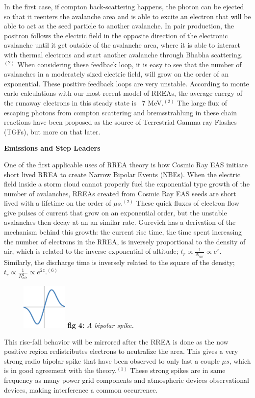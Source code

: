 \documentclass[11pt]{article}
\begin{document}
\begin{multicols*}{2}
    In the first case, if compton back-scattering happens, the photon can be ejected so that it reenters the avalanche area and is able to excite an electron that will be able to act as the seed particle to another avalanche. In pair production, the positron follows the electric field in the opposite direction of the electronic avalanche until it get outside of the avalanche area, where it is able to interact with thermal electrons and start another avalanche through Bhabha scattering.$^{(2)}$ When considering these feedback loop, it is easy to see that the number of avalanches in a moderately sized electric field, will grow on the order of an exponential. These positive feedback loops are very unstable. According to monte carlo calculations with our most recent model of RREAs, the average energy of the runaway electrons in this steady state is ~7 MeV.$^{(2)}$ The large flux of escaping photons from compton scattering and bremsstrahlung in these chain reactions have been proposed as the source of Terrestrial Gamma ray Flashes (TGFs), but more on that later. 
    \newline
    

    \noindent
{\bf \LARGE Emissions and Step Leaders}
    
    One of the first applicable uses of RREA theory is how Cosmic Ray EAS initiate short lived RREA to create Narrow Bipolar Events (NBEs). When the electric field inside a storm cloud cannot properly fuel the exponential type growth of the number of avalanches, RREAs created from Cosmic Ray EAS seeds are short lived with a lifetime on the order of $\mu s$.$^{(2)}$ These quick fluxes of electron flow give pulses of current that grow on an exponential order, but the unstable avalanches then decay at an an similar rate. Gurevich has a derivation of the mechanism behind this growth: the current rise time, the time spent increasing the number of electrons in the RREA, is inversely proportional to the density of air, which is related to the inverse exponential of altitude; $t_r \propto \frac{1}{N_{air}} \propto e^{z}$. Similarly, the discharge time is inversely related to the square of the density; $t_r \propto \frac{1}{N^2_{air}} \propto e^{2z}$.$^{(6)}$ 
    \begin{figure}
        \centering
        \includegraphics[width=0.2\textwidth]{images/desmos-graph.png}
        \textbf{fig 4:} \textit{A bipolar spike.}
    \end{figure}
    This rise-fall behavior will be mirrored after the RREA is done as the now positive region redistributes electrons to neutralize the area. This gives a very strong radio bipolar spike that have been observed to only last a couple $\mu s$, which is in good agreement with the theory.$^{(1)}$ These strong spikes are in same frequency as many power grid components and atmospheric devices observational devices, making interference a common occurrence.
    

\end{multicols*}
\end{document}
